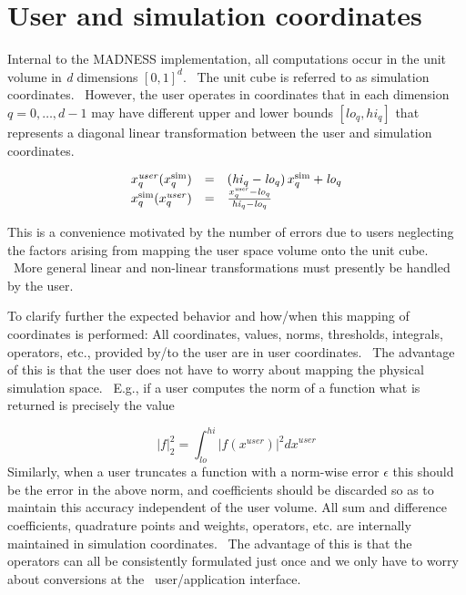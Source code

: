\documentclass[letterpaper]{article}
\begin{document}
\section{User and simulation coordinates}
Internal to the MADNESS implementation, all computations occur in the unit volume in \textit{d }dimensions  $[0,1]^{d}$.
\ The unit cube is referred to as simulation coordinates. \ However, the user operates in coordinates that in each
dimension  $q=0,\ldots ,d-1$ may have different upper and lower bounds 
$[\mathrm{{\mathit{lo}}}_{q},\mathrm{{\mathit{hi}}}_{q}]$ that represents a diagonal linear transformation between the
user and simulation coordinates.


\bigskip

\begin{equation}
\begin{matrix}\hfill
x_{q}^{\mathrm{{\mathit{user}}}}(x_{q}^{\mathrm{{sim}}})&\text{=}&\left(\mathrm{{\mathit{hi}}}_{q}-\mathrm{{\mathit{lo}}}_{q}\right)x_{q}^{\mathrm{{sim}}}+\mathrm{{\mathit{lo}}}_{q}\hfill\null
\\\hfill
x_{q}^{\mathrm{{sim}}}(x_{q}^{\mathrm{{\mathit{user}}}})&\text{=}&\frac{x_{q}^{\mathrm{{\mathit{user}}}}-\mathrm{{\mathit{lo}}}_{q}}{\mathrm{{\mathit{hi}}}_{q}-\mathrm{{\mathit{lo}}}_{q}}\hfill\null
\end{matrix}
\end{equation}

\bigskip

This is a convenience motivated by the number of errors due to users neglecting the factors arising from mapping the
user space volume onto the unit cube. \ More general linear and non-linear transformations must presently be handled by
the user.

To clarify further the expected behavior and how/when this mapping of coordinates is performed: All coordinates, values,
norms, thresholds, integrals, operators, etc., provided by/to the user are in user coordinates. \ The advantage of this
is that the user does not have to worry about mapping the physical simulation space. \ E.g., if a user computes the
norm of a function what is returned is precisely the value

\begin{equation}
\left|f\right|_{2}^{2}=\int
_{\mathrm{{\mathit{lo}}}}^{\mathrm{{\mathit{hi}}}}\left|f(x^{\mathrm{{\mathit{user}}}})\right|^{2}\mathit{dx}^{\mathrm{{\mathit{user}}}}
\end{equation}
Similarly, when a user truncates a function with a norm-wise error  $\epsilon $ this should be the error in the above
norm, and coefficients should be discarded so as to maintain this accuracy independent of the user volume. All sum and
difference coefficients, quadrature points and weights, operators, etc. are internally maintained in simulation
coordinates. \ The advantage of this is that the operators can all be consistently formulated just once and we only
have to worry about conversions at the \ user/application interface.
\end{document}
